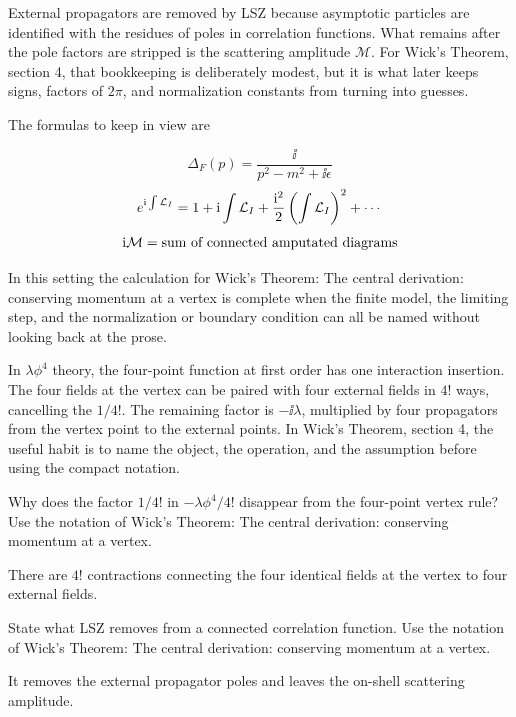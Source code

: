 External propagators are removed by LSZ because asymptotic particles are identified with the residues of poles in correlation functions.  What remains after the pole factors are stripped is the scattering amplitude \(\mathcal M\).  For Wick's Theorem, section 4, that bookkeeping is deliberately modest, but it is what later keeps signs, factors of \(2\pi\), and normalization constants from turning into guesses.

The formulas to keep in view are

\[
  \Delta_F(p)=\frac{\ii}{p^2-m^2+\ii\epsilon}
\]
\[
  e^{\mathrm i\int\mathcal L_I}=1+\mathrm i\int\mathcal L_I+\frac{\mathrm i^2}{2}\left(\int\mathcal L_I\right)^2+\cdots
\]
\[
  \mathrm i\mathcal M=\hbox{sum of connected amputated diagrams}
\]

In this setting the calculation for Wick's Theorem: The central derivation: conserving momentum at a vertex is complete when the finite model, the limiting step, and the normalization or boundary condition can all be named without looking back at the prose.




\begin{example}
In \(\lambda\phi^4\) theory, the four-point function at first order has one interaction insertion.  The four fields at the vertex can be paired with four external fields in \(4!\) ways, cancelling the \(1/4!\).  The remaining factor is \(-\ii\lambda\), multiplied by four propagators from the vertex point to the external points.  In Wick's Theorem, section 4, the useful habit is to name the object, the operation, and the assumption before using the compact notation.
\end{example}



\begin{exercise}
Why does the factor \(1/4!\) in \(-\lambda\phi^4/4!\) disappear from the four-point vertex rule?  Use the notation of Wick's Theorem: The central derivation: conserving momentum at a vertex.
\begin{answer}
There are \(4!\) contractions connecting the four identical fields at the vertex to four external fields.
\end{answer}
\end{exercise}

\begin{exercise}
State what LSZ removes from a connected correlation function.  Use the notation of Wick's Theorem: The central derivation: conserving momentum at a vertex.
\begin{answer}
It removes the external propagator poles and leaves the on-shell scattering amplitude.
\end{answer}
\end{exercise}



